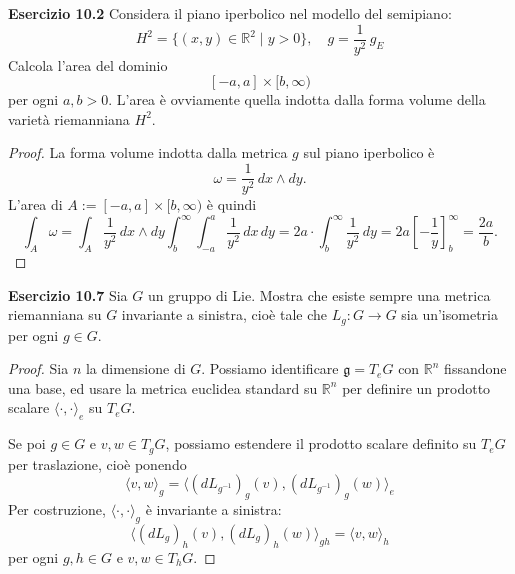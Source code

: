 \documentclass[a4paper]{article}
\newcommand{\R}{\mathbb{R}}
\theoremstyle{definition}
\theoremstyle{definition}
\theoremstyle{remark}
\theoremstyle{definition}
\begin{document}
\textbf{Esercizio 10.2}
Considera il piano iperbolico nel modello del semipiano:
\[
H^2 = \{(x, y) \in \R^2 \mid y > 0\}, \quad g = \frac{1}{y^2} \, g_E
\]
Calcola l'area del dominio
\[
[-a, a] \times [b, \infty)
\] per ogni $a, b > 0$. L'area è ovviamente quella indotta dalla forma volume della varietà riemanniana $H^2$.
\begin{proof}
La forma volume indotta dalla metrica $g$ sul piano iperbolico è
\[
    \omega = \frac{1}{y^2} \, dx \wedge dy
.\]
L'area di $A:=[-a, a] \times [b, \infty)$ è quindi
\[
    \int_A \omega = \int_A \frac{1}{y^2} \, dx \wedge dy
    \int_{b}^{\infty} \int_{-a}^{a} \frac{1}{y^2} \, dx \, dy = 2a\cdot \int_{b}^{\infty} \frac{1}{y^2} \, dy = 2a \left[ -\frac{1}{y} \right]_{b}^{\infty} = \frac{2a}{b}
.\]
\end{proof}
\textbf{Esercizio 10.7}
Sia $G$ un gruppo di Lie. Mostra che esiste sempre una metrica riemanniana su $G$ invariante a sinistra, cioè tale che $L_g : G \to G$ sia un'isometria per ogni $g \in G$.
\begin{proof}
Sia $n$ la dimensione di $G$. Possiamo identificare $\mathfrak{g}=T_eG$ con $\R^n$ fissandone una base, ed usare la metrica euclidea standard su $\R^n$ per
definire un prodotto scalare $\langle \cdot, \cdot \rangle_e$ su $T_eG$.

Se poi $g \in G$ e $v, w \in T_gG$, possiamo estendere il prodotto scalare definito su $T_eG$ per traslazione, cioè ponendo
\[
\langle v, w \rangle_g = \langle (dL_{g^{-1}})_g(v), (dL_{g^{-1}})_g(w) \rangle_e
\]
Per costruzione, $\langle \cdot, \cdot \rangle_g$ è invariante a sinistra:
\[
\langle (dL_g)_h(v), (dL_g)_h(w) \rangle_{gh} = \langle v, w \rangle_h
\]
per ogni $g, h \in G$ e $v, w \in T_hG$.

\end{proof}
\end{document}

